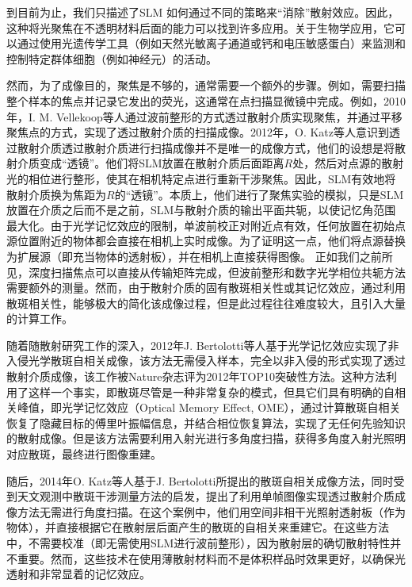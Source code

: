 到目前为止，我们只描述了SLM 如何通过不同的策略来“消除”散射效应。因此，这种将光聚焦在不透明材料后面的能力可以找到许多应用。关于生物学应用，它可以通过使用光遗传学工具（例如天然光敏离子通道或钙和电压敏感蛋白）来监测和控制特定群体细胞（例如神经元）的活动。

然而，为了成像目的，聚焦是不够的，通常需要一个额外的步骤。例如，需要扫描整个样本的焦点并记录它发出的荧光，这通常在点扫描显微镜中完成。例如，2010年，I. M. Vellekoop等人\cite{vellekoop_scattered_2010}通过波前整形的方式透过散射介质实现聚焦，并通过平移聚焦点的方式，实现了透过散射介质的扫描成像。2012年，O. Katz等人\cite{katz_looking_2012}意识到透过散射介质透过散射介质进行扫描成像并不是唯一的成像方式，他们的设想是将散射介质变成“透镜”。他们将SLM放置在散射介质后面距离$R$处，然后对点源的散射光的相位进行整形，使其在相机特定点进行重新干涉聚焦。因此，SLM有效地将散射介质换为焦距为$R$的“透镜”。本质上，他们进行了聚焦实验的模拟，只是SLM放置在介质之后而不是之前，SLM与散射介质的输出平面共轭，以使记忆角范围最大化。由于光学记忆效应的限制，单波前校正对附近点有效，任何放置在初始点源位置附近的物体都会直接在相机上实时成像。为了证明这一点，他们将点源替换为扩展源（即充当物体的透射板），并在相机上直接获得图像。
正如我们之前所见，深度扫描焦点可以直接从传输矩阵完成，但波前整形和数字光学相位共轭方法需要额外的测量。然而，由于散射介质的固有散斑相关性或其记忆效应，通过利用散斑相关性，能够极大的简化该成像过程，但是此过程往往难度较大，且引入大量的计算工作。

随着随散射研究工作的深入，2012年J. Bertolotti等人\cite{bertolotti_non-invasive_2012}基于光学记忆效应实现了非入侵光学散斑自相关成像，该方法无需侵入样本，完全以非入侵的形式实现了透过散射介质成像，该工作被Nature杂志评为2012年TOP10突破性方法。这种方法利用了这样一个事实，即散斑尽管是一种非常复杂的模式，但具它们具有明确的自相关峰值，即光学记忆效应（Optical Memory Effect, OME）\cite{Freund1988}，通过计算散斑自相关恢复了隐藏目标的傅里叶振幅信息，并结合相位恢复算法，实现了无任何先验知识的散射成像。但是该方法需要利用入射光进行多角度扫描，获得多角度入射光照明对应散斑，最终进行图像重建。

随后，2014年O. Katz等人\cite{katz_non-invasive_2014}基于J. Bertolotti所提出的散斑自相关成像方法，同时受到天文观测中散斑干涉测量方法的启发，提出了利用单帧图像实现透过散射介质成像方法无需进行角度扫描。在这个案例中，他们用空间非相干光照射透射板（作为物体），并直接根据它在散射层后面产生的散斑的自相关来重建它。在这些方法中，不需要校准（即无需使用SLM进行波前整形），因为散射层的确切散射特性并不重要。然而，这些技术在使用薄散射材料而不是体积样品时效果更好，以确保光透射和非常显着的记忆效应。

